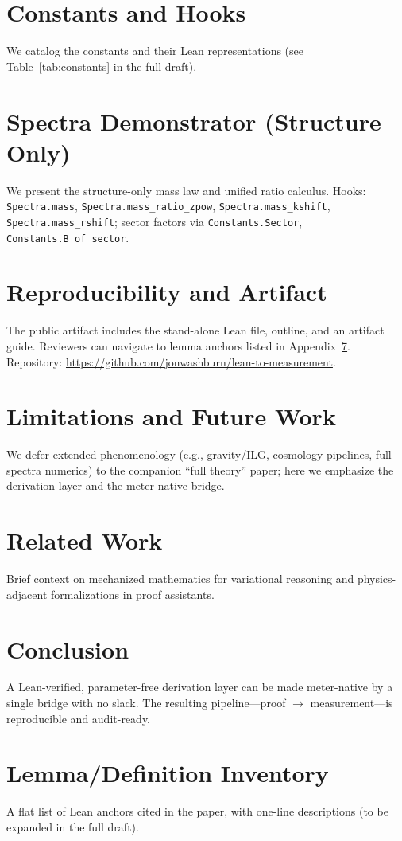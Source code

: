 \documentclass[11pt]{article}
\newcommand{\LeanHook}[1]{\texttt{#1}}
\newcommand{\LeanRepoURL}{https://github.com/jonwashburn/lean-to-measurement}
\begin{document}
\section{Constants and Hooks}
We catalog the constants and their Lean representations (see Table~\ref{tab:constants} in the full draft).

\section{Spectra Demonstrator (Structure Only)}
We present the structure-only mass law and unified ratio calculus. Hooks: \LeanHook{Spectra.mass}, \LeanHook{Spectra.mass\_ratio\_zpow}, \LeanHook{Spectra.mass\_kshift}, \LeanHook{Spectra.mass\_rshift}; sector factors via \LeanHook{Constants.Sector}, \LeanHook{Constants.B\_of\_sector}.

\section{Reproducibility and Artifact}
The public artifact includes the stand-alone Lean file, outline, and an artifact guide. Reviewers can navigate to lemma anchors listed in Appendix~\ref{app:lemmas}. Repository: \href{\LeanRepoURL}{\LeanRepoURL}.

\section{Limitations and Future Work}
We defer extended phenomenology (e.g., gravity/ILG, cosmology pipelines, full spectra numerics) to the companion “full theory” paper; here we emphasize the derivation layer and the meter-native bridge.

\section{Related Work}
Brief context on mechanized mathematics for variational reasoning and physics-adjacent formalizations in proof assistants.

\section{Conclusion}
A Lean-verified, parameter-free derivation layer can be made meter-native by a single bridge with no slack. The resulting pipeline—proof $\to$ measurement—is reproducible and audit-ready.

\appendix
\section{Lemma/Definition Inventory}\label{app:lemmas}
A flat list of Lean anchors cited in the paper, with one-line descriptions (to be expanded in the full draft).
\end{document}
